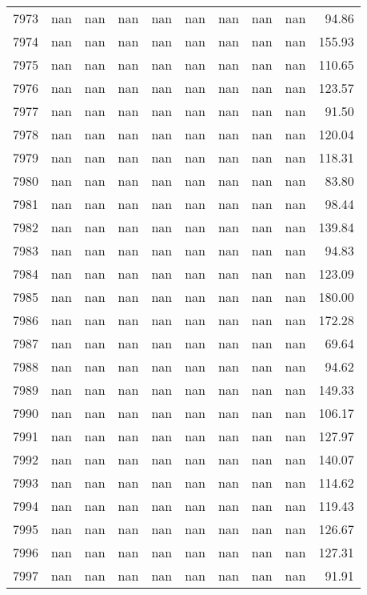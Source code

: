 \begin{tabular}{lrrrrrrrrr}
7973 & nan & nan & nan & nan & nan & nan & nan & nan & 94.86 \\
7974 & nan & nan & nan & nan & nan & nan & nan & nan & 155.93 \\
7975 & nan & nan & nan & nan & nan & nan & nan & nan & 110.65 \\
7976 & nan & nan & nan & nan & nan & nan & nan & nan & 123.57 \\
7977 & nan & nan & nan & nan & nan & nan & nan & nan & 91.50 \\
7978 & nan & nan & nan & nan & nan & nan & nan & nan & 120.04 \\
7979 & nan & nan & nan & nan & nan & nan & nan & nan & 118.31 \\
7980 & nan & nan & nan & nan & nan & nan & nan & nan & 83.80 \\
7981 & nan & nan & nan & nan & nan & nan & nan & nan & 98.44 \\
7982 & nan & nan & nan & nan & nan & nan & nan & nan & 139.84 \\
7983 & nan & nan & nan & nan & nan & nan & nan & nan & 94.83 \\
7984 & nan & nan & nan & nan & nan & nan & nan & nan & 123.09 \\
7985 & nan & nan & nan & nan & nan & nan & nan & nan & 180.00 \\
7986 & nan & nan & nan & nan & nan & nan & nan & nan & 172.28 \\
7987 & nan & nan & nan & nan & nan & nan & nan & nan & 69.64 \\
7988 & nan & nan & nan & nan & nan & nan & nan & nan & 94.62 \\
7989 & nan & nan & nan & nan & nan & nan & nan & nan & 149.33 \\
7990 & nan & nan & nan & nan & nan & nan & nan & nan & 106.17 \\
7991 & nan & nan & nan & nan & nan & nan & nan & nan & 127.97 \\
7992 & nan & nan & nan & nan & nan & nan & nan & nan & 140.07 \\
7993 & nan & nan & nan & nan & nan & nan & nan & nan & 114.62 \\
7994 & nan & nan & nan & nan & nan & nan & nan & nan & 119.43 \\
7995 & nan & nan & nan & nan & nan & nan & nan & nan & 126.67 \\
7996 & nan & nan & nan & nan & nan & nan & nan & nan & 127.31 \\
7997 & nan & nan & nan & nan & nan & nan & nan & nan & 91.91 \\

\end{tabular}
